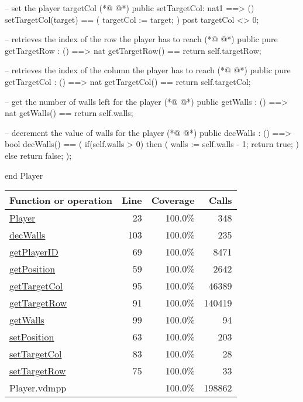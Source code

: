 \begin{vdmpp}[breaklines=true]
   -- set the player targetCol
(*@
\label{setTargetCol:83}
@*)
   public setTargetCol: nat1 ==> ()
   setTargetCol(target) ==
   (
    targetCol := target;
   )
   post targetCol <> 0;
   
   -- retrieves the index of the row the player has to reach
(*@
\label{getTargetRow:91}
@*)
   public pure getTargetRow : () ==> nat
   getTargetRow() == return self.targetRow;
   
   -- retrieves the index of the column the player has to reach
(*@
\label{getTargetCol:95}
@*)
   public pure getTargetCol : () ==> nat
   getTargetCol() == return self.targetCol;

   -- get the number of walls left for the player
(*@
\label{getWalls:99}
@*)
   public getWalls : () ==> nat
   getWalls() == return self.walls;
   
   -- decrement the value of walls for the player
(*@
\label{decWalls:103}
@*)
   public decWalls : () ==> bool
   decWalls() ==
   (
    if(self.walls > 0)
    then 
    (
     walls := self.walls - 1;
     return true;
    )
    else return false;
   );
   
end Player
\end{vdmpp}
\bigskip
\begin{longtable}{|l|r|r|r|}
\hline
Function or operation & Line & Coverage & Calls \\
\hline
\hline
\hyperref[Player:23]{Player} & 23&100.0\% & 348 \\
\hline
\hyperref[decWalls:103]{decWalls} & 103&100.0\% & 235 \\
\hline
\hyperref[getPlayerID:69]{getPlayerID} & 69&100.0\% & 8471 \\
\hline
\hyperref[getPosition:59]{getPosition} & 59&100.0\% & 2642 \\
\hline
\hyperref[getTargetCol:95]{getTargetCol} & 95&100.0\% & 46389 \\
\hline
\hyperref[getTargetRow:91]{getTargetRow} & 91&100.0\% & 140419 \\
\hline
\hyperref[getWalls:99]{getWalls} & 99&100.0\% & 94 \\
\hline
\hyperref[setPosition:63]{setPosition} & 63&100.0\% & 203 \\
\hline
\hyperref[setTargetCol:83]{setTargetCol} & 83&100.0\% & 28 \\
\hline
\hyperref[setTargetRow:75]{setTargetRow} & 75&100.0\% & 33 \\
\hline
\hline
Player.vdmpp & & 100.0\% & 198862 \\
\hline
\end{longtable}

